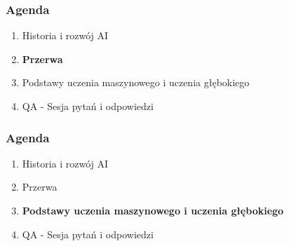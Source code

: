 \documentclass[smaller]{beamer}
\begin{document}

\begin{frame}
\frametitle{Agenda}
\begin{enumerate}
    \item \color{gray}Historia i rozwój AI
    \item \textbf{\color{black}Przerwa}
    \item \color{gray}Podstawy uczenia maszynowego i uczenia głębokiego
    \item \color{gray}QA - Sesja pytań i odpowiedzi
\end{enumerate}
\end{frame}


\begin{frame}
\frametitle{Agenda}
\begin{enumerate}
    \item \color{gray}Historia i rozwój AI
    \item \color{gray}Przerwa
    \item \textbf{\color{black}Podstawy uczenia maszynowego i uczenia głębokiego}
    \item \color{gray}QA - Sesja pytań i odpowiedzi
\end{enumerate}
\end{frame}

\end{document}
